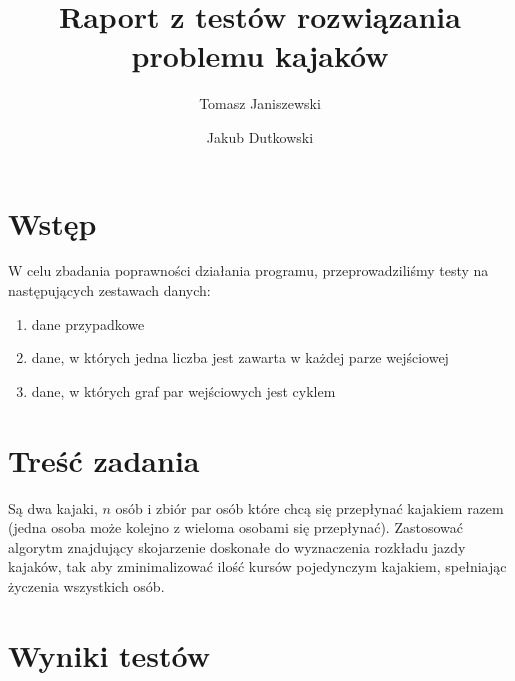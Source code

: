 \documentclass{llncs}
\begin{document}
\title{Raport z testów rozwiązania problemu kajaków}
%
%
\author{Tomasz Janiszewski \and Jakub Dutkowski}
%
%


\maketitle              %

%
\section{Wstęp}
W celu zbadania poprawności działania programu, przeprowadziliśmy testy na następujących zestawach danych:
\begin{enumerate}
\item dane przypadkowe
\item dane, w których jedna liczba jest zawarta w każdej parze wejściowej
\item dane, w których graf par wejściowych jest cyklem
\end{enumerate}

\section{Treść zadania}
Są dwa kajaki, $n$ osób i zbiór par osób które chcą się
przepłynać kajakiem razem (jedna osoba może kolejno z wieloma osobami się
przepłynać). Zastosować algorytm znajdujący skojarzenie doskonałe do
wyznaczenia rozkładu jazdy kajaków, tak aby zminimalizować ilość kursów
pojedynczym kajakiem, spełniając życzenia wszystkich osób.

\section{Wyniki testów}
\end{document}
